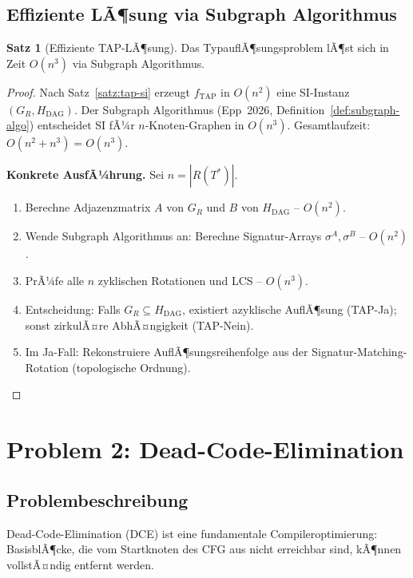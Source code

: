 ﻿\documentclass[a4paper,12pt]{article}
\theoremstyle{definition}
\newtheorem{satz}{Satz}
\begin{document}
\subsection{Effiziente LÃ¶sung via Subgraph Algorithmus}

\begin{satz}[Effiziente TAP-LÃ¶sung]
Das TypauflÃ¶sungsproblem lÃ¶st sich in Zeit $O(n^3)$ via Subgraph Algorithmus.
\end{satz}

\begin{proof}
Nach Satz~\ref{satz:tap-si} erzeugt $f_{\text{TAP}}$ in $O(n^2)$ eine SI-Instanz $(G_R, H_{\text{DAG}})$. Der Subgraph Algorithmus (Epp~2026, Definition~\ref{def:subgraph-algo}) entscheidet SI fÃ¼r $n$-Knoten-Graphen in $O(n^3)$. Gesamtlaufzeit: $O(n^2 + n^3) = O(n^3)$.

\textbf{Konkrete AusfÃ¼hrung.} Sei $n = |R(T^*)|$.
\begin{enumerate}
    \item Berechne Adjazenzmatrix $A$ von $G_R$ und $B$ von $H_{\text{DAG}}$ -- $O(n^2)$.
    \item Wende Subgraph Algorithmus an: Berechne Signatur-Arrays $\sigma^A, \sigma^B$ -- $O(n^2)$.
    \item PrÃ¼fe alle $n$ zyklischen Rotationen und LCS -- $O(n^3)$.
    \item Entscheidung: Falls $G_R \subseteq H_{\text{DAG}}$, existiert azyklische AuflÃ¶sung (TAP-Ja); sonst zirkulÃ¤re AbhÃ¤ngigkeit (TAP-Nein).
    \item Im Ja-Fall: Rekonstruiere AuflÃ¶sungsreihenfolge aus der Signatur-Matching-Rotation (topologische Ordnung).
\end{enumerate}
\end{proof}

\section{Problem 2: Dead-Code-Elimination}
\label{sec:dce}

\subsection{Problembeschreibung}

Dead-Code-Elimination (DCE) ist eine fundamentale Compileroptimierung: BasisblÃ¶cke, die vom Startknoten des CFG aus nicht erreichbar sind, kÃ¶nnen vollstÃ¤ndig entfernt werden.
\end{document}
